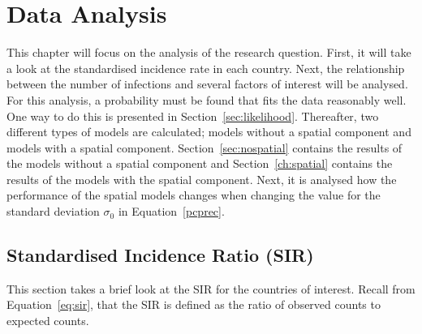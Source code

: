 %
\chapter{Data Analysis}
\label{sec:analysis}
This chapter will focus on the analysis of the research question. First, it will take a look at the standardised incidence rate in each country. Next, the relationship between the number of infections and several factors of interest will be analysed. For this analysis, a probability must be found that fits the data reasonably well. One way to do this is presented in Section~\ref{sec:likelihood}. Thereafter, two different types of models are calculated; models without a spatial component and models with a spatial component. Section~\ref{sec:nospatial} contains the results of the models without a spatial component and Section~\ref{ch:spatial} contains the results of the models with the spatial component. Next, it is analysed how the performance of the spatial models changes when changing the value for the standard deviation $\sigma_0$ in Equation~\ref{pcprec}.
\clearpage
\section{Standardised Incidence Ratio (SIR)}
This section takes a brief look at the SIR for the countries of interest. Recall from Equation~\ref{eq:sir}, that the SIR is defined as the ratio of observed counts to expected counts.
